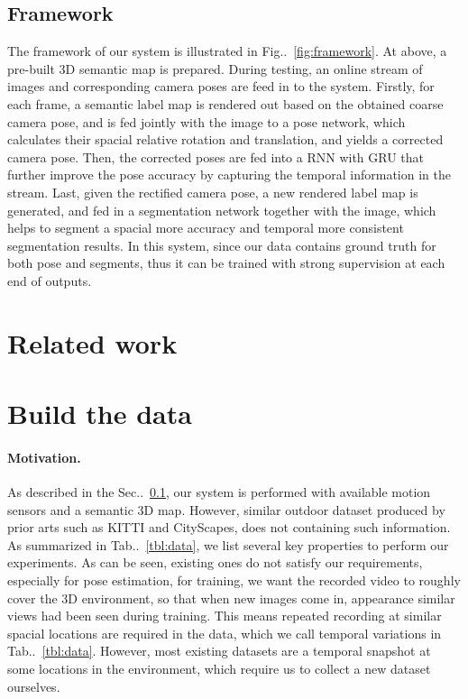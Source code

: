 \documentclass[10pt,twocolumn,letterpaper]{article}
\makeatletter
\newcommand{\figref}[1]{Fig\onedot~\ref{#1}}
\newcommand{\secref}[1]{Sec\onedot~\ref{#1}}
\newcommand{\tabref}[1]{Tab\onedot~\ref{#1}}
\DeclareRobustCommand\onedot{\futurelet\@let@token\@onedot}
\def\onedot{\ifx\@let@token.\else.\null\fi\xspace}
\makeatother
\begin{document}
\subsection{Framework}
\label{sub:framework}
The framework of our system is illustrated in \figref{fig:framework}. At above, a pre-built 3D semantic map is prepared. During testing, an online stream of images and corresponding camera poses are feed in to the system. Firstly, for each frame, a semantic label map is rendered out based on the obtained coarse camera pose, and is fed jointly with the image to a pose network,  which calculates their spacial relative rotation and translation, and yields a corrected camera pose. Then, the corrected poses are fed into a RNN with GRU that further improve the pose accuracy by capturing the temporal information in the stream. 
Last, given the rectified camera pose, a new rendered label map is generated, and fed in a segmentation network together with the image, which helps to segment a spacial more accuracy and temporal more consistent segmentation results.
In this system, since our data contains ground truth for both pose and segments, thus it can be trained with strong supervision at each end of outputs.

\section{Related work}
\label{sec:related_work}



\section{Build the data}
\label{sec:data_collection}

\paragraph{Motivation.}
As described in the \secref{sub:framework}, our system is performed with available motion sensors and a semantic 3D map. 
However, similar outdoor dataset produced by prior arts such as KITTI and CityScapes, does not containing such information. As summarized in \tabref{tbl:data}, we list several key properties to perform our experiments. 
As can be seen, existing ones do not satisfy our requirements, especially for pose estimation, for training, we want the recorded video to roughly cover the 3D environment, so that when new images come in, appearance similar views had been seen during training. This means repeated recording at similar spacial locations are required in the data, which we call temporal variations in \tabref{tbl:data}.
However, most existing datasets are a temporal snapshot at some locations in the environment, which require us to collect a new dataset ourselves.
\end{document}

